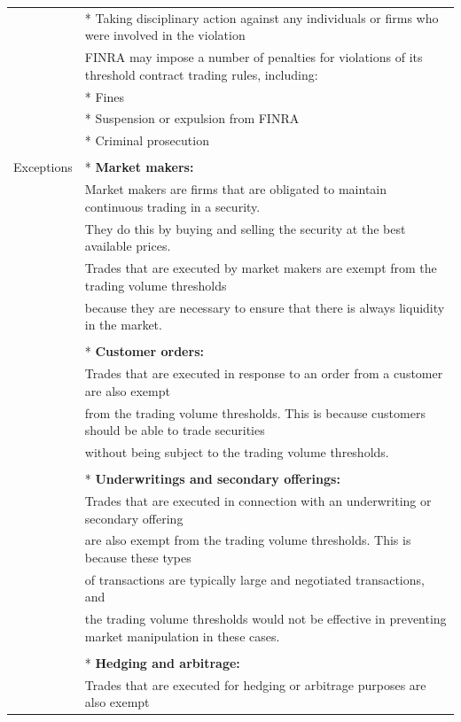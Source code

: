 \documentclass[11pt]{article}
\begin{document}
\begin{center}
\begin{tabular}{ll}
 & * Taking disciplinary action against any individuals or firms who were involved in the violation\\[0pt]
 & FINRA may impose a number of penalties for violations of its threshold contract trading rules, including:\\[0pt]
 & * Fines\\[0pt]
 & * Suspension or expulsion from FINRA\\[0pt]
 & * Criminal prosecution\\[0pt]
 & \\[0pt]
Exceptions & * \textbf{\textbf{Market makers:}}\\[0pt]
 & Market makers are firms that are obligated to maintain continuous trading in a security.\\[0pt]
 & They do this by buying and selling the security at the best available prices.\\[0pt]
 & Trades that are executed by market makers are exempt from the trading volume thresholds\\[0pt]
 & because they are necessary to ensure that there is always liquidity in the market.\\[0pt]
 & \\[0pt]
 & * \textbf{\textbf{Customer orders:}}\\[0pt]
 & Trades that are executed in response to an order from a customer are also exempt\\[0pt]
 & from the trading volume thresholds. This is because customers should be able to trade securities\\[0pt]
 & without being subject to the trading volume thresholds.\\[0pt]
 & \\[0pt]
 & * \textbf{\textbf{Underwritings and secondary offerings:}}\\[0pt]
 & Trades that are executed in connection with an underwriting or secondary offering\\[0pt]
 & are also exempt from the trading volume thresholds. This is because these types\\[0pt]
 & of transactions are typically large and negotiated transactions, and\\[0pt]
 & the trading volume thresholds would not be effective in preventing market manipulation in these cases.\\[0pt]
 & \\[0pt]
 & * \textbf{\textbf{Hedging and arbitrage:}}\\[0pt]
 & Trades that are executed for hedging or arbitrage purposes are also exempt\\[0pt]

\end{tabular}
\end{center}
\end{document}
